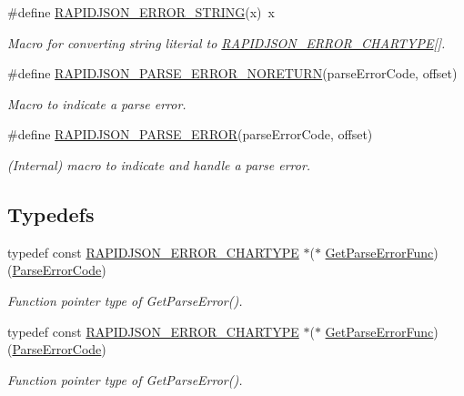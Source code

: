 \begin{DoxyCompactItemize}
\#define \hyperlink{group___r_a_p_i_d_j_s_o_n___e_r_r_o_r_s_gabe2e1bd1349e5a7d6c1af78c05a98f0d}{R\+A\+P\+I\+D\+J\+S\+O\+N\+\_\+\+E\+R\+R\+O\+R\+\_\+\+S\+T\+R\+I\+NG}(x)~x
\begin{DoxyCompactList}\small\item\em Macro for converting string literial to \hyperlink{group___r_a_p_i_d_j_s_o_n___e_r_r_o_r_s_ga7e4636fd48d0148f102b8a13f0539d8c}{R\+A\+P\+I\+D\+J\+S\+O\+N\+\_\+\+E\+R\+R\+O\+R\+\_\+\+C\+H\+A\+R\+T\+Y\+PE}\mbox{[}\mbox{]}. \end{DoxyCompactList}\item 
\#define \hyperlink{group___r_a_p_i_d_j_s_o_n___e_r_r_o_r_s_ga7f8c4265b2edda78568ae3338aaf1461}{R\+A\+P\+I\+D\+J\+S\+O\+N\+\_\+\+P\+A\+R\+S\+E\+\_\+\+E\+R\+R\+O\+R\+\_\+\+N\+O\+R\+E\+T\+U\+RN}(parse\+Error\+Code,  offset)
\begin{DoxyCompactList}\small\item\em Macro to indicate a parse error. \end{DoxyCompactList}\item 
\#define \hyperlink{group___r_a_p_i_d_j_s_o_n___e_r_r_o_r_s_gae3689840fa6e89a241313f33b602f865}{R\+A\+P\+I\+D\+J\+S\+O\+N\+\_\+\+P\+A\+R\+S\+E\+\_\+\+E\+R\+R\+OR}(parse\+Error\+Code,  offset)
\begin{DoxyCompactList}\small\item\em (Internal) macro to indicate and handle a parse error. \end{DoxyCompactList}\end{DoxyCompactItemize}
\subsection*{Typedefs}
\begin{DoxyCompactItemize}
\item 
typedef const \hyperlink{group___r_a_p_i_d_j_s_o_n___e_r_r_o_r_s_ga7e4636fd48d0148f102b8a13f0539d8c}{R\+A\+P\+I\+D\+J\+S\+O\+N\+\_\+\+E\+R\+R\+O\+R\+\_\+\+C\+H\+A\+R\+T\+Y\+PE} $\ast$($\ast$ \hyperlink{group___r_a_p_i_d_j_s_o_n___e_r_r_o_r_s_ga586548166441ab3ce30219cb35be2e04}{Get\+Parse\+Error\+Func}) (\hyperlink{group___r_a_p_i_d_j_s_o_n___e_r_r_o_r_s_ga8d4b32dfc45840bca189ade2bbcb6ba7}{Parse\+Error\+Code})
\begin{DoxyCompactList}\small\item\em Function pointer type of Get\+Parse\+Error(). \end{DoxyCompactList}\item 
typedef const \hyperlink{group___r_a_p_i_d_j_s_o_n___e_r_r_o_r_s_ga7e4636fd48d0148f102b8a13f0539d8c}{R\+A\+P\+I\+D\+J\+S\+O\+N\+\_\+\+E\+R\+R\+O\+R\+\_\+\+C\+H\+A\+R\+T\+Y\+PE} $\ast$($\ast$ \hyperlink{group___r_a_p_i_d_j_s_o_n___e_r_r_o_r_s_ga586548166441ab3ce30219cb35be2e04}{Get\+Parse\+Error\+Func}) (\hyperlink{group___r_a_p_i_d_j_s_o_n___e_r_r_o_r_s_ga8d4b32dfc45840bca189ade2bbcb6ba7}{Parse\+Error\+Code})
\begin{DoxyCompactList}\small\item\em Function pointer type of Get\+Parse\+Error(). \end{DoxyCompactList}\end{DoxyCompactItemize}
